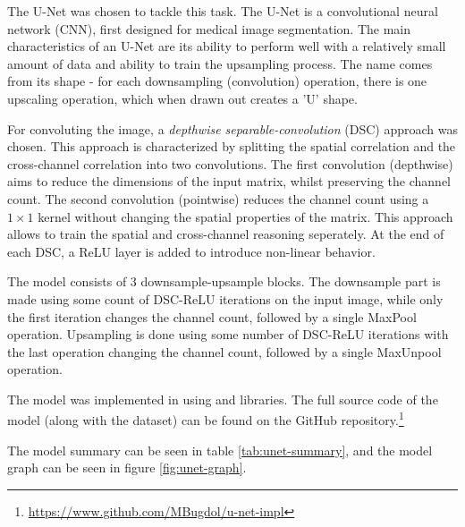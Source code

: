 \documentclass[../main.tex]{subfiles}
\begin{document}
\newcommand{\vertsep}{\unskip\ \vline\ } %

The U-Net was chosen to tackle this task. The U-Net is a convolutional neural network (CNN), first designed for medical image segmentation. The main characteristics of an U-Net are its ability to perform well with a relatively small amount of data and ability to train the upsampling process. The name comes from its shape - for each downsampling (convolution) operation, there is one upscaling operation, which when drawn out creates a 'U' shape.

For convoluting the image, a \emph{depthwise separable-convolution} (DSC) approach was chosen. This approach is characterized by splitting the spatial correlation and the cross-channel correlation into two convolutions.
The first convolution (depthwise) aims to reduce the dimensions of the input matrix, whilst preserving the channel count. The second convolution (pointwise) reduces the channel count using a $1\times 1$ kernel without changing the spatial properties of the matrix. This approach allows to train the spatial and cross-channel reasoning seperately.
At the end of each DSC, a ReLU layer is added to introduce non-linear behavior.

The model consists of 3 downsample-upsample blocks. The downsample part is made using some count of DSC-ReLU iterations on the input image, while only the first iteration changes the channel count, followed by a single MaxPool operation. Upsampling is done using some number of DSC-ReLU iterations with the last operation changing the channel count, followed by a single MaxUnpool operation.

The model was implemented in  using  and  libraries. The full source code of the model (along with the dataset) can be found on the GitHub repository.\footnote{\href{https://www.github.com/MBugdol/u-net-impl}{https://www.github.com/MBugdol/u-net-impl}}

The model summary can be seen in table \ref{tab:unet-summary}, and the model graph can be seen in figure \ref{fig:unet-graph}.
\end{document}
